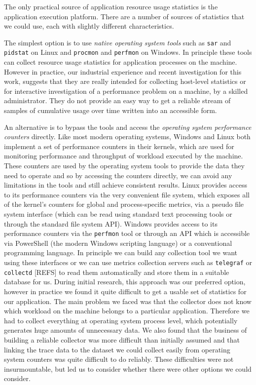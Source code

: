 The only practical source of application resource usage statistics is the application execution platform.  There are a number of sources of statistics that we could use, each with slightly different characteristics.

The simplest option is to use \emph{native operating system tools} such as \texttt{sar} and \texttt{pidstat} on Linux and \texttt{procmon} and \texttt{perfmon} on Windows.  In principle these tools can collect resource usage statistics for application processes on the machine.  However in practice, our industrial experience and recent investigation for this work, suggests that they are really intended for collecting host-level statistics or for interactive investigation of a performance problem on a machine, by a skilled administrator.  They do not provide an easy way to get a reliable stream of samples of cumulative usage over time written into an accessible form.

An alternative is to bypass the tools and access the \emph{operating system performance counters} directly.  Like most modern operating systems, Windows and Linux both implement a set of performance counters in their kernels, which are used for monitoring performance and throughput of workload executed by the machine.  These counters are used by the operating system tools to provide the data they need to operate and so by accessing the counters directly, we can avoid any limitations in the tools and still achieve consistent results.  Linux provides access to its performance counters via the very convenient  file system, which exposes all of the kernel's counters for global and process-specific metrics, via a pseudo file system interface (which can be read using standard text processing tools or through the standard file system API).  Windows provides access to its performance counters via the \texttt{perfmon} tool or through an API which is accessible via PowerShell (the modern Windows scripting language) or a conventional programming language.  In principle we can build any collection tool we want using these interfaces or we can use metrics collection servers such as \texttt{telegraf} or \texttt{collectd} [REFS] to read them automatically and store them in a suitable database for us.  During initial research, this approach was our preferred option, however in practice we found it quite difficult to get a usable set of statistics for our application.  The main problem we faced was that the collector does not know which workload on the machine belongs to a particular application.  Therefore we had to collect everything at operating system process level, which potentially generates huge amounts of unnecessary data.  We also found that the business of building a reliable collector was more difficult than initially assumed and that linking the trace data to the dataset we could collect easily from operating system counters was quite difficult to do reliably.  These difficulties were not insurmountable, but led us to consider whether there were other options we could consider.

